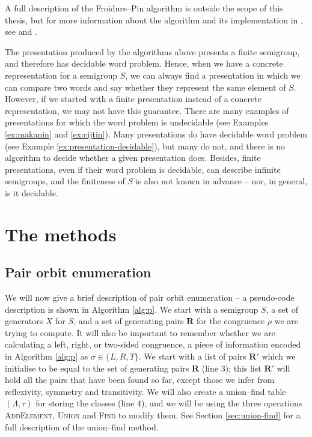 A full description of the Froidure--Pin algorithm is outside the scope of this
thesis, but for more information about the algorithm and its implementation in
\libsemigroups{}, see \cite{froidure_pin} and \cite{froidure_pin_jonusas}.

The presentation produced by the algorithms above presents a finite semigroup,
and therefore has decidable word problem.  Hence, when we have a concrete
representation for a semigroup $S$, we can always find a presentation in which
we can compare two words and say whether they represent the same element of $S$.
However, if we started with a finite presentation instead of a concrete
representation, we may not have this guarantee.  There are many examples of
presentations for which the word problem is undecidable (see Examples
\ref{ex:makanin} and \ref{ex:cijtin}). Many presentations do have decidable word
problem (see Example \ref{ex:presentation-decidable}), but many do not, and
there is no algorithm to decide whether a given presentation does.  Besides,
finite presentations, even if their word problem is decidable, can describe
infinite semigroups, and the finiteness of $S$ is also not known in advance --
nor, in general, is it decidable.

\section{The methods}
\label{sec:methods}

\subsection{Pair orbit enumeration}
\label{sec:p}

We will now give a brief description of pair orbit enumeration -- a pseudo-code
description is shown in Algorithm \ref{alg:p}.  We start with a semigroup $S$, a
set of generators $X$ for $S$, and a set of generating pairs $\mathbf{R}$ for
the congruence $\rho$ we are trying to compute.  It will also be important to
remember whether we are calculating a left, right, or two-sided congruence, a
piece of information encoded in Algorithm \ref{alg:p} as $\sigma \in \{L,R,T\}$.
We start with a list of pairs $\mathbf{R}'$ which we initialise to be equal to
the set of generating pairs $\mathbf{R}$ (line 3); this list $\mathbf{R}'$ will hold all
the pairs that have been found so far, except those we infer from reflexivity,
symmetry and transitivity.  We will also create a union--find table
$(\Lambda,\tau)$ for storing the classes (line 4), and we will be using the three
operations \textsc{AddElement}, \textsc{Union} and \textsc{Find} to modify them.
See Section \ref{sec:union-find} for a full description of the union--find
method.

